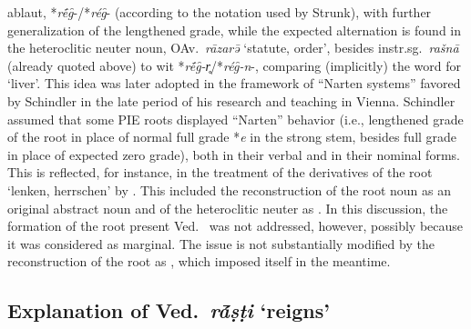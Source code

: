 \documentclass[output=paper,colorlinks,citecolor=brown]{langscibook}
\begin{document}
ablaut, *\textit{rḗg̑}-/*\textit{rég̑}-  (according to the notation used by Strunk), with further generalization of the lengthened grade, while the expected alternation is found in the heteroclitic neuter noun, OAv.\  \textit{rāzarə̄}   ‘statute, order’, besides instr.sg.\ \textit{rašnā} (already quoted above) to wit *\textit{rḗg̑-r̥}/*\textit{rég̑-n}-, comparing (implicitly) the word for ‘liver’.  This idea was later adopted in the framework of “Narten systems” favored by Schindler in the late period of his research and teaching in Vienna. Schindler assumed that some PIE roots displayed “Narten” behavior (i.e., lengthened grade of the root in place of normal full grade *\textit{e} in the strong stem, besides full grade in place of expected zero grade), both in their verbal and in their nominal forms. This is reflected, for instance, in the treatment of the derivatives of the root  ‘lenken, herrschen’ by \citet[29--31]{Widmer1997}.  This included the reconstruction of the root noun as an original abstract noun and of the heteroclitic neuter as . In this discussion, the formation of the root present Ved.\   was not addressed, however, possibly because it was considered as marginal. The issue is not substantially modified by the reconstruction of the root as , which imposed itself in the meantime. 

\subsection{Explanation of Ved.\  \textit{rā́ṣṭi} ‘reigns’ }
\end{document}
